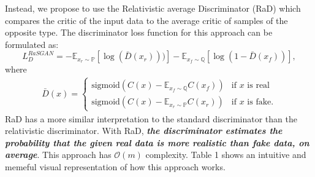 \documentclass{article}
\begin{document}
Instead, we propose to use the Relativistic average Discriminator (RaD) which compares the critic of the input data to the average critic of samples of the opposite type. The discriminator loss function for this approach can be formulated as: 
\begin{equation}
L_D^{RaSGAN} = -\mathbb{E}_{x_r \sim \mathbb{P}}\left[\log \left( \bar{D}(x_r) \right)) \right] - \mathbb{E}_{x_f \sim \mathbb{Q}} \left[\log \left(1- \bar{D}(x_f) \right) \right],
\end{equation}
where
\begin{equation}
\begin{aligned} 
\bar{D}(x)= 
\begin{cases}
\text{sigmoid}(C(x)-\mathbb{E}_{x_f \sim \mathbb{Q}} C(x_f))& \text{if } x \text{ is real}\\
\text{sigmoid}(C(x)-\mathbb{E}_{x_r \sim \mathbb{P}} C(x_r)) & \text{if } x \text{ is fake}.
\end{cases}
\end{aligned}
\end{equation}
RaD has a more similar interpretation to the standard discriminator than the relativistic discriminator. With RaD, \textbf{\textit{the discriminator estimates the probability that the given real data is more realistic than fake data, on average}}. This approach has $\mathcal{O}(m)$ complexity. Table 1 shows an intuitive and memeful visual representation of how this approach works. 
\end{document}
